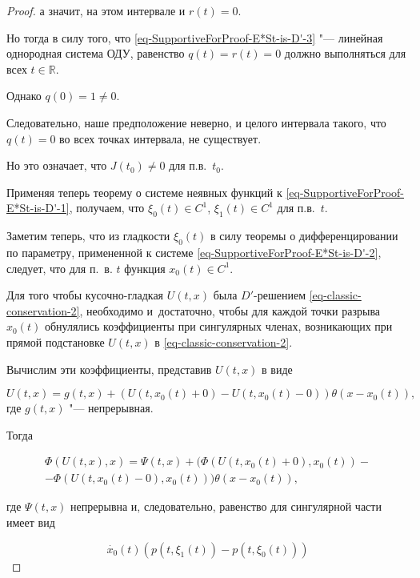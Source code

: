 \begin{proof}
а значит, на этом интервале и $r(t)=0$. 

Но тогда в силу того, что \eqref{eq-SupportiveForProof-E*St-is-D'-3} "--- линейная однородная система ОДУ, равенство $q(t)=r(t)=0$ должно выполняться для всех $t\in\mathbb{R}$. 

Однако $q(0)=1\ne0$. 



Следовательно, наше предположение неверно, и целого интервала такого, что $q(t)=0$ во всех точках интервала, не существует. 

Но это означает, что $J(t_0)\ne0$ для п.в.~$t_0$. 



Применяя теперь теорему о системе неявных функций к \eqref{eq-SupportiveForProof-E*St-is-D'-1}, получаем, что $\xi_0(t)\in C^1$, $\xi_1(t)\in C^1$ для п.в.~$t$.



Заметим теперь, что из гладкости $\xi_0(t)$ в силу теоремы о дифференцировании по параметру, примененной к системе \eqref{eq-SupportiveForProof-E*St-is-D'-2}, следует, что для п.~в. $t$ функция $x_0(t)\in C^1$.



Для того чтобы кусочно-гладкая $U(t,x)$ была $D'$-решением \eqref{eq-classic-conservation-2}, необходимо и~достаточно, чтобы для каждой точки разрыва $x_0(t)$ обнулялись коэффициенты при сингулярных членах, возникающих при прямой подстановке $U(t,x)$ в \eqref{eq-classic-conservation-2}. 



Вычислим эти коэффициенты, представив $U(t,x)$ в виде 

$$U(t,x)=g(t,x)+(U(t,x_0(t)+0)-U(t,x_0(t)-0))\theta(x-x_0(t)),$$ где $g(t,x)$ "--- непрерывная. 

Тогда

\begin{multline}

\Phi(U(t,x),x)=\Psi(t,x)+(\Phi(U(t,x_0(t)+0),x_0(t)) -

\\

-\Phi(U(t,x_0(t)-0),x_0(t)))\theta(x-x_0(t)),

\end{multline}

где $\Psi(t,x)$  непрерывна и, следовательно, равенство для сингулярной части имеет вид

\begin{equation}

\dot{x_0}(t)(p(t,\xi_1(t))-p(t,\xi_0(t)))


\end{equation}
\end{proof}
